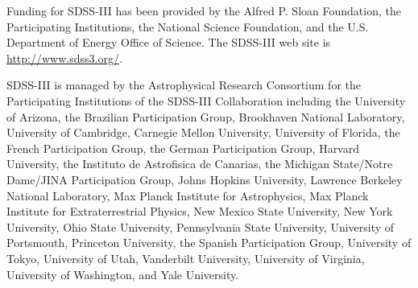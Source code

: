 \documentclass{emulateapj}
\begin{document}

\acknowledgments
Funding for SDSS-III has been provided by the Alfred P. Sloan Foundation, the Participating Institutions, the National Science Foundation, and the U.S. Department of Energy Office of Science. The SDSS-III web site is \url{http://www.sdss3.org/}.

SDSS-III is managed by the Astrophysical Research Consortium for the Participating Institutions of the SDSS-III Collaboration including the University of Arizona, the Brazilian Participation Group, Brookhaven National Laboratory, University of Cambridge, Carnegie Mellon University, University of Florida, the French Participation Group, the German Participation Group, Harvard University, the Instituto de Astrofisica de Canarias, the Michigan State/Notre Dame/JINA Participation Group, Johns Hopkins University, Lawrence Berkeley National Laboratory, Max Planck Institute for Astrophysics, Max Planck Institute for Extraterrestrial Physics, New Mexico State University, New York University, Ohio State University, Pennsylvania State University, University of Portsmouth, Princeton University, the Spanish Participation Group, University of Tokyo, University of Utah, Vanderbilt University, University of Virginia, University of Washington, and Yale University.
\\




\end{document}
